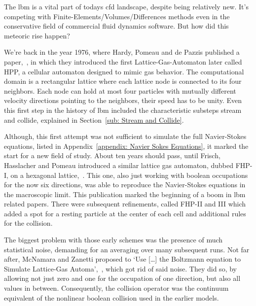 
The \gls{lbm} is a vital part of todays \gls{cfd} landscape, despite being relatively new.
It's competing with Finite-Elements/Volumes/Differences methods even in the conservative field of commercial fluid dynamics software.
But how did this meteoric rise happen?

We're back in the year 1976, where Hardy, Pomeau and de Pazzis published a paper,~\cite{hardy1976molecular}, in which they introduced the first Lattice-Gas-Automaton later called HPP, a cellular automaton designed to mimic gas behavior.
The computational domain is a rectangular lattice where each lattice node is connected to its four neighbors.
Each node can hold at most four particles with mutually different velocity directions pointing to the neighbors, their speed has to be unity.
Even this first step in the history of \gls{lbm} included the characteristic substeps stream and collide, explained in Section~\ref{sub: Stream and Collide}.

Although, this first attempt was not sufficient to simulate the full Navier-Stokes equations, listed in Appendix~\ref{appendix: Navier Sokes Equations}, it marked the start for a new field of study.
About ten years should pass, until Frisch, Hasslacher and Pomeau introduced a similar lattice gas automaton, dubbed FHP-I, on a hexagonal lattice,~\cite{frisch1986lattice}.
This one, also just working with boolean occupations for the now six directions, was able to reproduce the Navier-Stokes equations in the macroscopic limit.
This publication marked the beginning of a boom in \gls{lbm} related papers.
There were subsequent refinements, called FHP-II and III which added a spot for a resting particle at the center of each cell and additional rules for the collision.

The biggest problem with those early schemes was the presence of much statistical noise, demanding for an averaging over many subsequent runs.
Not far after, McNamara and Zanetti proposed to `Use [\ldots] the Boltzmann equation to Simulate Lattice-Gas Automa',~\cite{PhysRevLett.61.2332}, which got rid of said noise.
They did so, by allowing not just zero and one for the occupation of one direction, but also all values in between.
Consequently, the collision operator was the continuum equivalent of the nonlinear boolean collision used in the earlier models.

